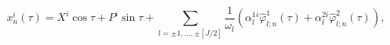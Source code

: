 \begin{equation}\label{sol-b}
  x^i_n(\tau)=X^i\cos\tau+P^i\sin\tau+\sum_{l=\pm 1,\dots,\pm [J/2]}
  \frac{1}{\omega_l}(\alpha_l^{1i}\hat{\varphi}^1_{l;n}(\tau)+
  \alpha_l^{2i}\hat{\varphi}^2_{l;n}(\tau)),
\end{equation}

